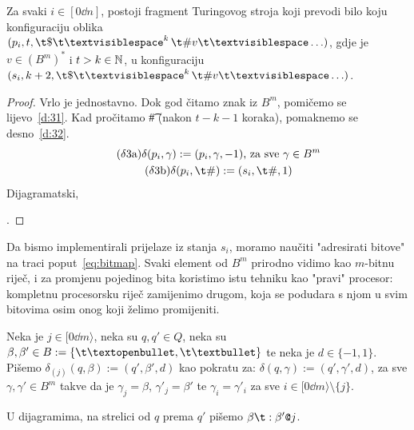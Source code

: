 \begin{lema}[{name=[{treći fragment transpiliranog stroja, priprema za instrukciju}]}]\label{lm:pi>si}
Za svaki $i\in[0\dd n]$, postoji fragment Turingovog stroja koji prevodi bilo koju konfiguraciju oblika $(p_i,t,\t\$\bl^k\,\t\#v\bl\ldots)$, gdje je $v\in(B^m)^*$ i $t>k\in{\mathbb N}$, u konfiguraciju $(s_i,k+2,\t\$\bl^k\,\t\#v\bl\ldots)$.
\end{lema}
\begin{proof}
Vrlo je jednostavno. Dok god čitamo znak iz $B^m$, pomičemo se lijevo~\eqref{d:31}. Kad pročitamo \t\# (nakon $t-k-1$ koraka), pomaknemo se desno~\eqref{d:32}.
\begin{gather*}
\label{d:31}\tag{$\delta$3a}
    \delta(p_i,\gamma):=(p_i,\gamma,-1)\text{, za sve }\gamma\in B^m\\
\label{d:32}\tag{$\delta$3b}
    \delta(p_i,\t\#):=(s_i,\t\#,1)
\end{gather*}
Dijagramatski,
\;.
\end{proof}


Da bismo implementirali prijelaze iz stanja $s_i$, moramo naučiti "adresirati bitove" na traci poput~\eqref{eq:bitmap}. Svaki element od $B^m$ prirodno vidimo kao $m$-bitnu riječ, i za promjenu pojedinog bita koristimo istu tehniku kao "pravi" procesor: kompletnu procesorsku riječ zamijenimo drugom, koja se podudara s njom u svim bitovima osim onog koji želimo promijeniti.

\begin{definicija}[{name=[funkcija prijelaza u određenom tragu]}]\label{def:trag}
Neka je $j\in[0\dd m\rangle$, neka su $q,q'\in Q$, neka su $\beta,\beta'\in B:=\{\t\textopenbullet,\t\textbullet\}$ te neka je $d\in\{-1,1\}$. Pišemo $\delta_{(j)}(q,\beta):=(q',\beta',d)$ kao pokratu za:
$\delta(q,\gamma):=(q',\gamma',d)$\text,
za sve $\gamma,\gamma'\in B^m$ takve da je $\gamma_j=\beta$, $\gamma'_j=\beta'$ te $\gamma_i=\gamma'_i$ za sve $i\in[0\dd m\rangle\setminus\{j\}$.

U dijagramima, na strelici od $q$ prema $q'$ pišemo $\beta\t:\beta'\texttt@j$.
\end{definicija}

